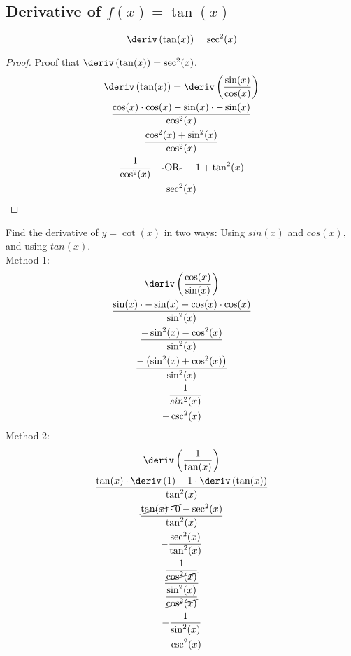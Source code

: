 \subsection{Derivative of $f(x) = \tan(x)$ }
\begin{equation}
    \deriv \left(\tan(x)\right) = \sec^2(x)
\end{equation}
\begin{proof}
    Proof that $\deriv\left(\tan(x)\right) = \sec^2(x)$.
    \begin{gather*}
        \deriv \left(\tan(x)\right) = \deriv \left(\dfrac{\sin(x)}{\cos(x)}\right) \\
        \dfrac{\cos(x) \cdot \cos(x) - \sin(x) \cdot - \sin(x)}{\cos^2(x)} \\
        \dfrac{\cos^2(x) + \sin^2(x)}{\cos^2(x)} \\
        \dfrac{1}{\cos^2(x)} \text{\quad -OR- \quad} 1 + \tan^2(x) \\
        \sec^2(x)
    \end{gather*}
\end{proof}
\begin{example}
    Find the derivative of $y = \cot(x)$ in two ways: Using $sin(x)$ and $cos(x)$, and using $tan(x)$. \\
    Method 1:
    \begin{gather*}
        \deriv\left(\dfrac{\cos(x)}{\sin(x)}\right) \\
        \dfrac{\sin(x) \cdot -\sin(x) - \cos(x) \cdot \cos(x)}{\sin^2(x)} \\
        \dfrac{-\sin^2(x) - \cos^2(x)}{\sin^2(x)} \\
        \dfrac{-\left(\sin^2(x) + \cos^2(x)\right)}{\sin^2(x)} \\
        -\dfrac{1}{sin^2(x)} \\
        -\csc^2(x)
    \end{gather*}
    Method 2:
    \begin{gather*}
        \deriv\left(\dfrac{1}{\tan(x)}\right) \\
        \dfrac{\tan(x) \cdot \deriv\left(1\right) - 1 \cdot \deriv\left(\tan(x)\right)}{\tan^2(x)} \\
        \dfrac{\cancel{\tan(x) \cdot 0} - \sec^2(x)}{\tan^2(x)} \\
        -\dfrac{\sec^2(x)}{\tan^2(x)} \\
        \dfrac{\dfrac{1}{\cancel{\cos^2(x)}}}{\dfrac{\sin^2(x)}{\cancel{\cos^2(x)}}} \\
        -\dfrac{1}{\sin^2(x)} \\
        -\csc^2(x)
    \end{gather*}
\end{example}
